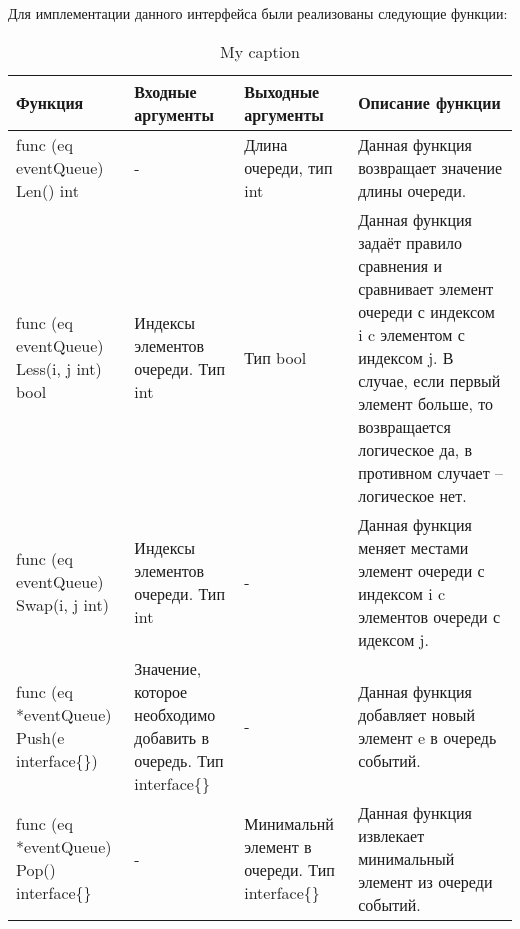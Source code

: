 Для имплементации данного интерфейса были реализованы следующие функции: 

\begin{table}[]
\centering
\caption{My caption}
\label{my-label}
\begin{tabularx}{\textwidth}{|X|X|X|X|}
\hline
Функция                                      & Входные аргументы                                                          & Выходные аргументы                              & Описание функции                                                                                                                                                                                                         \\ \hline
func (eq eventQueue) Len() int               & -                                                                          & Длина очереди, тип int                          & Данная функция возвращает значение длины очереди.                                                                                                                                                                        \\ \hline
func (eq eventQueue) Less(i, j int) bool     & Индексы элементов очереди. Тип int                                         & Тип bool                                        & Данная функция задаёт правило сравнения и  сравнивает элемент очереди с индексом i c элементом с индексом j. В случае, если первый элемент больше, то возвращается логическое да, в противном случает -- логическое нет. \\ \hline
func (eq eventQueue) Swap(i, j int)          & Индексы элементов очереди. Тип int                                         & -                                               & Данная функция меняет местами элемент очереди с индексом i c элементов очереди с идексом j.                                                                                                                              \\ \hline
func (eq *eventQueue) Push(e interface\{\})  & Значение, которое необходимо добавить в очередь. Тип interface\{\}         & -                                               & Данная функция добавляет новый элемент e в очередь событий.                                                                                                                                                              \\ \hline
func (eq *eventQueue) Pop() interface\{\}    & -                                                                          & Минимальнй элемент в очереди. Тип interface\{\} & Данная функция извлекает минимальный элемент из очереди событий.                                                                                                                                                         \\ \hline

\end{tabularx}
\end{table}
